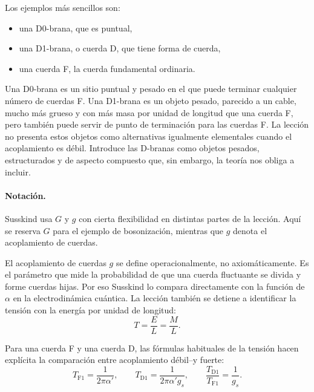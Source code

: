 Los ejemplos más sencillos son:
\begin{itemize}
\item una D0-brana, que es puntual,
\item una D1-brana, o cuerda D, que tiene forma de cuerda,
\item una cuerda F, la cuerda fundamental ordinaria.
\end{itemize}
Una D0-brana es un sitio puntual y pesado en el que puede terminar cualquier número de cuerdas F. Una D1-brana es un objeto pesado, parecido a un cable, mucho más grueso y con más masa por unidad de longitud que una cuerda F, pero también puede servir de punto de terminación para las cuerdas F. La lección no presenta estos objetos como alternativas igualmente elementales cuando el acoplamiento es débil. Introduce las D-branas como objetos pesados, estructurados y de aspecto compuesto que, sin embargo, la teoría nos obliga a incluir.


\paragraph{Notación.}
Susskind usa \(G\) y \(g\) con cierta flexibilidad en distintas partes de la lección. Aquí se reserva \(G\) para el ejemplo de bosonización, mientras que \(g\) denota el acoplamiento de cuerdas.

El acoplamiento de cuerdas \(g\) se define operacionalmente, no axiomáticamente. Es el parámetro que mide la probabilidad de que una cuerda fluctuante se divida y forme cuerdas hijas. Por eso Susskind lo compara directamente con la función de \(\alpha\) en la electrodinámica cuántica. La lección también se detiene a identificar la tensión con la energía por unidad de longitud:
\begin{equation}
T=\frac{E}{L}=\frac{M}{L}.
\end{equation}

Para una cuerda F y una cuerda D, las fórmulas habituales de la tensión hacen explícita la comparación entre acoplamiento débil--y fuerte:
\begin{equation}
T_{\mathrm{F1}}=\frac{1}{2\pi\alpha'},
\qquad
T_{\mathrm{D1}}=\frac{1}{2\pi\alpha' g_s},
\qquad
\frac{T_{\mathrm{D1}}}{T_{\mathrm{F1}}}=\frac{1}{g_s}.
\end{equation}

